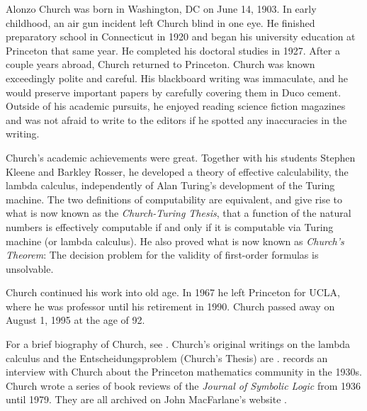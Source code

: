 \documentclass[../../../include/open-logic-section]{subfiles}
\begin{document}



Alonzo Church was born in Washington, DC on June 14, 1903.  In early
childhood, an air gun incident left Church blind in one eye. He
finished preparatory school in Connecticut in 1920 and began his
university education at Princeton that same year. He completed his
doctoral studies in 1927. After a couple years abroad, Church returned
to Princeton. Church was known exceedingly polite and careful. His
blackboard writing was immaculate, and he would preserve important
papers by carefully covering them in Duco cement. Outside of his
academic pursuits, he enjoyed reading science fiction magazines and
was not afraid to write to the editors if he spotted any inaccuracies
in the writing.

Church's academic achievements were great.  Together with his students
Stephen Kleene and Barkley Rosser, he developed a theory of effective
calculability, the lambda calculus, independently of Alan Turing's
development of the Turing machine. The two definitions of
computability are equivalent, and give rise to what is now known as
the \emph{Church-Turing Thesis}, that a function of the natural
numbers is effectively computable if and only if it is computable via
Turing machine (or lambda calculus). He also proved what is now known
as \emph{Church's Theorem}: The decision problem for the validity of
first-order formulas is unsolvable.

Church continued his work into old age. In 1967 he left Princeton for
UCLA, where he was professor until his retirement in 1990. Church
passed away on August 1, 1995 at the age of 92.

\begin{reading} 
For a brief biography of Church, see \citet{EndertonND}.  Church's
original writings on the lambda calculus and the Entscheidungsproblem
(Church's Thesis) are \citet{Church1936,Church1936a}.
\citet{Aspray1984} records an interview with Church about the
Princeton mathematics community in the 1930s.
Church wrote a series of book reviews of the \emph{Journal of
Symbolic Logic} from 1936 until 1979. They are all archived on John
MacFarlane's website \citep{MacFarlane2015}.
\end{reading} 
\end{document}
